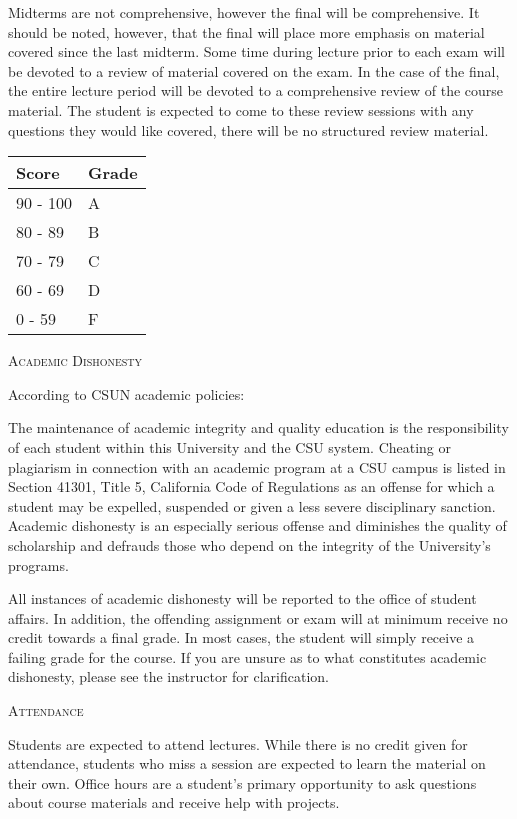 \documentclass{letter}
\newcommand{\heading}[1]{{\large \textsc{#1}}}
\begin{document}
Midterms are not comprehensive, however the final will be comprehensive.  It
should be noted, however, that the final will place more emphasis on material
covered since the last midterm.  Some time during lecture prior to each exam
will be devoted to a review of material covered on the exam.  In the case of
the final, the entire lecture period will be devoted to a comprehensive review
of the course material.  The student is expected to come to these review
sessions with any questions they would like covered, there will be no
structured review material.

\begin{center}
  \begin{tabular}{ l | l }
    {\bf Score} & {\bf Grade} \\
    \hline
    90 - 100 & A \\
    80 - 89 & B \\
    70 - 79 & C \\
    60 - 69 & D \\
    0 - 59 & F \\
  \end{tabular}
\end{center}

\heading{Academic Dishonesty}

According to CSUN academic policies:

\begin{displayquote}
The maintenance of academic integrity and quality education is the
responsibility of each student within this University and the CSU system.
Cheating or plagiarism in connection with an academic program at a CSU campus
is listed in Section 41301, Title 5, California Code of Regulations as an
offense for which a student may be expelled, suspended or given a less severe
disciplinary sanction. Academic dishonesty is an especially serious offense and
diminishes the quality of scholarship and defrauds those who depend on the
integrity of the University's programs.
\end{displayquote}

All instances of academic dishonesty will be reported to the office of student
affairs.  In addition, the offending assignment or exam will at minimum receive
no credit towards a final grade.  In most cases, the student will simply
receive a failing grade for the course.  If you are unsure as to what
constitutes academic dishonesty, please see the instructor for clarification.

\heading{Attendance}

Students are expected to attend lectures.  While there is no credit given for
attendance, students who miss a session are expected to learn the material on
their own.  Office hours are a student's primary opportunity to ask questions
about course materials and receive help with projects.
\end{document}
